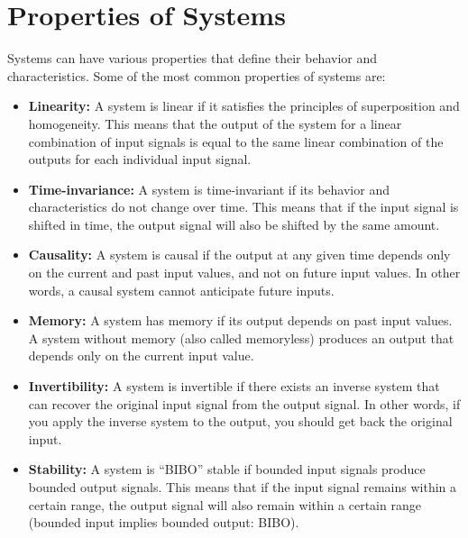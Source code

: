 \section{Properties of Systems}
Systems can have various properties that define their behavior and characteristics. Some of the most common properties of systems are:
\begin{itemize}
    \item \textbf{Linearity:} A system is linear if it satisfies the principles of superposition and homogeneity. This means that the output of the system for a linear combination of input signals is equal to the same linear combination of the outputs for each individual input signal.
    \item \textbf{Time-invariance:} A system is time-invariant if its behavior and characteristics do not change over time. This means that if the input signal is shifted in time, the output signal will also be shifted by the same amount.
    \item \textbf{Causality:} A system is causal if the output at any given time depends only on the current and past input values, and not on future input values. In other words, a causal system cannot anticipate future inputs.
    \item \textbf{Memory:} A system has memory if its output depends on past input values. A system without memory (also called memoryless) produces an output that depends only on the current input value.
    \item \textbf{Invertibility:} A system is invertible if there exists an inverse system that can recover the original input signal from the output signal. In other words, if you apply the inverse system to the output, you should get back the original input.
    \item \textbf{Stability:} A system is ``BIBO'' stable if bounded input signals produce bounded output signals. This means that if the input signal remains within a certain range, the output signal will also remain within a certain range (bounded input implies bounded output: BIBO).
\end{itemize}
